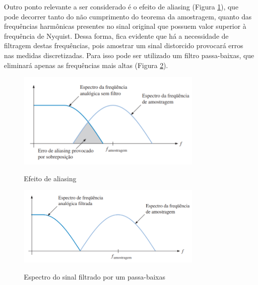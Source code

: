 \documentclass[oneside,openright,12pt]{ufsm_2015} %
\begin{document}
Outro ponto relevante a ser considerado é o efeito de aliasing (Figura \ref{fig:efeito-aliasing}), que pode decorrer tanto do não cumprimento do teorema da amostragem, quanto das frequências harmônicas presentes no sinal original que possuem valor superior à frequência de Nyquist. Dessa forma, fica evidente que há a necessidade de filtragem destas frequências, pois amostrar um sinal distorcido provocará erros nas medidas discretizadas. Para isso pode ser utilizado um filtro passa-baixas, que eliminará apenas as frequências mais altas (Figura \ref{fig:passa-baixas}).

\begin{figure}[ht]
    \caption{\label{exepretex} Efeito de aliasing}
    \centering
    \includegraphics[width=0.8\textwidth]{figuras/aliasing.png}
    \vspace{\baselineskip} %
        \label{fig:efeito-aliasing}
\end{figure}

\begin{figure}[ht]
    \caption{\label{exepretex} Espectro do sinal filtrado por um passa-baixas}
    \centering
    \includegraphics[width=0.8\textwidth]{figuras/passa-baixas.png}
    \vspace{\baselineskip} %
        \label{fig:passa-baixas}
\end{figure}
\end{document}
